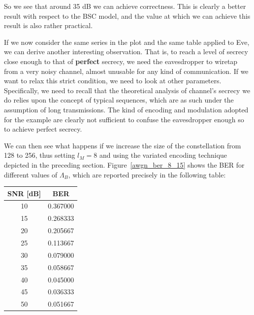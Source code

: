 \documentclass[a4paper,12pt,titlepage]{article}
\begin{document}
So we see that around 35 dB we can achieve correctness. This is clearly a
better result with respect to the BSC model, and the value at which we can
achieve this result is also rather practical.

If we now consider the same series in the plot and the same table applied to
Eve, we can derive another interesting observation. That is, to reach a level
of secrecy close enough to that of \textbf{perfect} secrecy, we need the
eavesdropper to wiretap from a very noisy channel, almost unusable for any kind
of communication. If we want to relax this strict condition, we need to look at
other parameters. Specifically, we need to recall that the theoretical analysis
of channel's secrecy we do relies upon the concept of typical sequences, which
are as such under the assumption of long transmissions. The kind of encoding
and modulation adopted for the example are clearly not sufficient to confuse
the eavesdropper enough so to achieve perfect secrecy.

We can then see what happens if we increase the size of the constellation from
128 to 256, thus setting $l_M = 8$ and using the variated encoding technique
depicted in the preceding section.
Figure~\ref{awgn_ber_8_15} shows the BER for different values of $\Lambda_B$,
which are reported precisely in the following table:

\begin{tabular}{ | c | c | }
  \hline
  \textbf{SNR [dB]} & \textbf{BER} \\
  \hline
  10 & 0.367000 \\
  15 & 0.268333 \\
  20 & 0.205667 \\
  25 & 0.113667 \\
  30 & 0.079000 \\
  35 & 0.058667 \\
  40 & 0.045000 \\
  45 & 0.036333 \\
  50 & 0.051667 \\
  \hline
\end{tabular}
\end{document}
